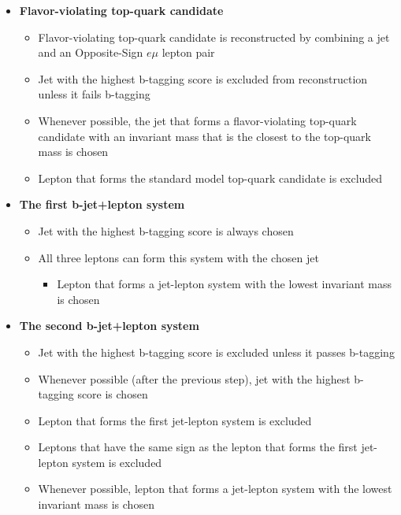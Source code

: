 \begin{itemize}
\begin{itemize}
\begin{itemize}
\end{itemize}
\end{itemize}
\item \textbf{Flavor-violating top-quark candidate }
\begin{itemize}
\item Flavor-violating top-quark candidate is reconstructed by combining a jet and an Opposite-Sign $e\mu$ lepton pair
\item Jet with the highest b-tagging score is excluded from reconstruction unless it fails b-tagging 
\item Whenever possible, the jet that forms a flavor-violating top-quark candidate with an invariant mass that is the closest to the top-quark mass is chosen
\item Lepton that forms the standard model top-quark candidate is excluded 
\end{itemize}
\item \textbf{The first b-jet+lepton system }
\begin{itemize}
\item Jet with the highest b-tagging score is always chosen 
\item All three leptons can form this system with the chosen jet 
\begin{itemize}
\item Lepton that forms a jet-lepton system with the lowest invariant mass is chosen 
\end{itemize}
\end{itemize}
\item \textbf{The second b-jet+lepton system}
\begin{itemize}
\item Jet with the highest b-tagging score is excluded unless it passes b-tagging 
\item Whenever possible (after the previous step), jet with the highest b-tagging score is chosen 
\item Lepton that forms the first jet-lepton system is excluded 
\item Leptons that have the same sign as the lepton that forms the first jet-lepton system is excluded 
\item Whenever possible, lepton that forms a jet-lepton system with the lowest invariant mass is chosen 
\end{itemize}
\end{itemize}